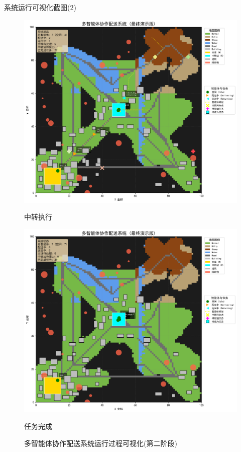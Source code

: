 \documentclass[
10pt,
aspectratio=169,
]{beamer}
\begin{document}
\begin{frame}{系统运行可视化截图(2)}
    \begin{figure}
        \centering
        \begin{minipage}[t]{0.4\textwidth}
            \centering
            \includegraphics[width=\textwidth]{visualization_snapshots/4.png}
            \caption{中转执行}
        \end{minipage}
        \hfill
        \begin{minipage}[t]{0.4\textwidth}
            \centering
            \includegraphics[width=\textwidth]{visualization_snapshots/5.png}
            \caption{任务完成}
        \end{minipage}
        
        \caption{多智能体协作配送系统运行过程可视化(第二阶段)}
    \end{figure}
\end{frame}
\end{document}

